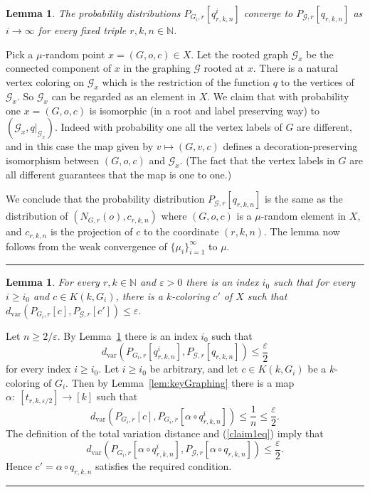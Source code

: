 \documentclass{article}
\newtheorem{lemma}[theorem]{Lemma}
\newenvironment{proof}{{\bf Proof.}}{\hfill\rule{2mm}{2mm}\medskip}
\def\GG{\mathcal{G}}\def\HH{\mathcal{H}}\def\II{\mathcal{I}}
\def\eps{\varepsilon}
\newcommand{\dvar}{{d_{\mathrm{var}}}}
\begin{document}
\begin{lemma}\label{prlem1}
The probability distributions $P_{G_i,r}[q^i_{r,k,n}]$ converge to
$P_{\GG,r}[q_{r,k,n}]$ {as $i\to\infty$} for every fixed triple
$r,k,n\in\mathbb{N}$.
\end{lemma}
%
\begin{proof}
Pick a $\mu$-random point $x=(G,o,c) \in X$. Let the rooted graph
$\GG_x$ be the connected component of $x$ in the graphing $\GG$
rooted at $x$. There is a natural vertex coloring on $\GG_x$ which is
the restriction of the function $q$ to the vertices of $\GG_x$. So
$\GG_x$ can be regarded as an element in $X$. We claim that with
probability one $x=(G,o,c)$ is isomorphic (in a root and label
preserving way) to $(\GG_x,q|_{\GG_x})$. Indeed with probability one
all the vertex labels of $G$ are different, and in this case the map
given by $v\mapsto(G,v,c)$ defines a decoration-preserving
isomorphism between $(G,o,c)$ and $\GG_x$. (The fact that the vertex
labels in $G$ are all different guarantees that the map is one to
one.)

We conclude that the probability distribution
$P_{\GG,r}[q_{r,k,n}]$ is the same as the distribution of
$(N_{G,r}(o),c_{r,k,n})$ where $(G,o,c)$ is a $\mu$-random element in $X$, and
$c_{r,k,n}$ is the
projection of $c$ to the coordinate $(r,k,n)$. The lemma now follows from the
weak
convergence of $\{\mu_i\}_{i=1}^\infty$ to $\mu$.
\end{proof}

\begin{lemma}
For every $r,k\in\mathbb{N}$ {and $\eps>0$} there is an index $i_0$
such that for every $i\geq i_0$ and $c\in K(k,G_i)$, there is a
$k$-coloring $c'$ of $X$ such that $\dvar(P_{G_i,r}[c],
P_{\GG,r}[c']) \le\eps.$
\end{lemma}

\begin{proof}
Let $n\ge 2/\eps$. By Lemma~\ref{prlem1} there is an index $i_0$ such
that
\begin{equation}\label{claim1eq}
\dvar(P_{G_i,r}[q^i_{r,k,n}],
P_{\GG,r}[q_{r,k,n}])\leq \frac{\eps}{2}
\end{equation}
for every index $i\geq i_0$. Let $i\geq i_0$ be arbitrary, and let
$c\in K(k,G_i)$ be a $k$-coloring of $G_i$. Then by
Lemma~\ref{lem:keyGraphing} there is a map
$\alpha:~[t_{r,k,\eps/2}]\rightarrow[k]$ such that
\[
\dvar(P_{G_i,r}[c],P_{G_i,r}[\alpha\circ q^i_{r,k,n}])\leq\frac1n \le
\frac{\eps}{2}.
\]
The definition of the total variation distance and (\ref{claim1eq})
imply that
\[
\dvar(P_{G_i,r}[\alpha\circ q^i_{r,k,n}],
P_{\GG,r}[\alpha\circ q_{r,k,n}])\leq \frac{\eps}{2}.
\]
Hence $c'=\alpha\circ q_{r,k,n}$ satisfies the required condition.
\end{proof}
\end{document}
